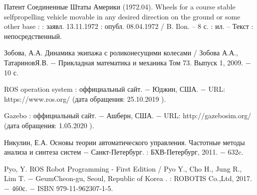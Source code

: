 \documentclass[oneside,final,14pt]{extreport}
\begin{document}
\begin{thebibliography}{0}
Патент  Соединенные Штаты Америки (1972.04). Wheels for a course stable selfpropelling vehicle movable in any desired direction on the ground or some other base :  : заявл. 13.11.1972 : опубл. 08.04.1972 / B. Ilon. – 8 с. : ил. – Текст : непосредственный.

Зобова, А.А.
Динамика экипажа с роликонесущими колесами
/ 
 Зобова А.А., ТатариновЯ.В.  
$-$ Прикладная математика и механика Том	73. Выпуск 1, 2009. $-$ 10 с.

ROS operation system : оффициальный сайт. $-$ Юджин, США. $-$  URL: https://www.ros.org/ (дата обращения: 25.10.2019 ).

Gazebo : оффициальный сайт.  $-$ Ашберн, США. $-$ URL: http://gazebosim.org/ (дата обращения: 1.05.2020 ).


Никулин, Е.А. Основы теории автоматического управления. Частотные методы анализа и синтеза систем  $-$ Санкт-Петербург. : БХВ-Петербург, 2011. $-$ 632c.

 Pyo, Y.
ROS Robot Programming - First Edition
/
 Pyo Y., Cho H., Jung R., Lim T.
$-$  GeumCheon-gu, Seoul, Republic of Korea
. : ROBOTIS Co.,Ltd, 2017.
 $-$ 460с.
 $-$ ISBN
 979-11-962307-1-5.


\end{thebibliography}
\end{document}
